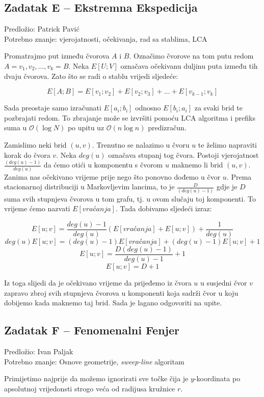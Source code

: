 \documentclass[a4paper]{article}
\begin{document}
\subsection*{Zadatak E -- Ekstremna Ekspedicija}
\textsf{Predložio: Patrick Pavić}\\
\textsf{Potrebno znanje: vjerojatnosti, očekivanja, rad sa stablima, LCA}

Promatrajmo put između čvorova $A$ i $B$. Označimo čvorove na tom putu redom $A
= v_1, v_2, \ldots , v_k = B$.  Neka $E[U;V]$ označava očekivanu duljinu puta
između tih dvaju čvorova. Zato što se radi o stablu vrijedi sljedeće:

\[E[A;B] = E[v_1;v_2] + E[v_2;v_3] + \ldots + E[v_{k-1};v_k]\]

Sada preostaje samo izračunati $E[a_i;b_i]$ odnosno $E[b_i;a_i]$ za svaki brid
te pozbrajati redom. To zbrajanje može se izvršiti pomoću LCA algoritma i
prefiks suma u $\mathcal{O}(\log N)$ po upitu uz $\mathcal{O}(n \log n)$
predizračun.

Zamislimo neki brid $(u, v)$. Trenutno se nalazimo u čvoru $u$ te želimo
napraviti korak do čvora $v$. Neka $deg(u)$ označava stupanj tog čvora. Postoji
vjerojatnost $\frac{(deg(u) - 1)}{deg(u)}$ da ćemo otići u komponentu s čvorom
$u$ maknemo li brid $(u, v)$. Zanima nas očekivano vrijeme prije nego što
ponovno dođemo u čvor $u$. Prema stacionarnoj distribuciji u Markovljevim
lancima, to je $\frac{D}{(deg(u) - 1)}$ gdje je $D$ suma svih stupnjeva čvorova
u tom grafu, tj. u ovom slučaju toj komponenti. To vrijeme ćemo nazvati
$E[vraćanja]$. Tada dobivamo sljedeći izraz:

\[E[u;v] = \frac{deg(u) - 1}{deg(u)}(E[vraćanja] + E[u;v]) + \frac{1}{deg(u)}\]
\[deg(u)E[u;v] = (deg(u) - 1)E[vraćanja] + (deg(u) - 1) E[u;v] + 1\]
\[E[u;v] = \frac{D(deg(u) - 1)}{deg(u) - 1} + 1\]
\[E[u;v] = D + 1\]

Iz toga slijedi da je očekivano vrijeme da prijeđemo iz čvora $u$ u susjedni
čvor $v$ zapravo zbroj svih stupnjeva čvorova u komponenti koja sadrži čvor u
koju dobijemo kada maknemo taj brid.  Sada je lagano odgovoriti na upite.

\subsection*{Zadatak F -- Fenomenalni Fenjer}
\textsf{Predložio: Ivan Paljak}\\
\textsf{Potrebno znanje: Osnove geometrije, \textit{sweep-line} algoritam}

Primijetimo najprije da možemo ignorirati sve točke čija je $y$-koordinata po
apsolutnoj vrijedonsti strogo veća od radijusa kružnice $r$.
\end{document}
